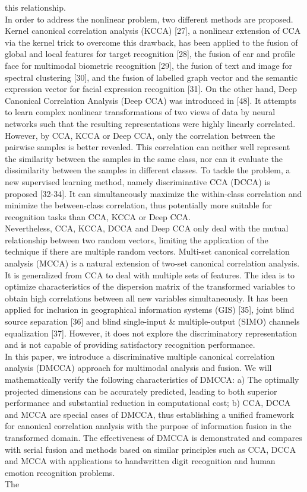\documentclass[journal]{IEEEtran}
\begin{document}
this relationship. \\\indent In order to address the nonlinear problem, two different methods are proposed. Kernel canonical correlation analysis (KCCA) [27], a nonlinear extension of CCA via the kernel trick to overcome this drawback, has been applied to the fusion of global and local features for target recognition [28], the fusion of ear and profile face for multimodal biometric recognition [29], the fusion of text and image for spectral clustering [30], and the fusion of labelled graph vector and the semantic expression vector for facial expression recognition [31]. On the other hand, Deep Canonical Correlation Analysis (Deep CCA) was introduced in [48]. It attempts to learn complex nonlinear transformations of two views of data by neural networks such that the resulting representations were highly linearly correlated. \\\indent However, by CCA, KCCA or Deep CCA, only the correlation between the pairwise samples is better revealed. This correlation can neither well represent the similarity between the samples in the same class, nor can it evaluate the dissimilarity between the samples in different classes. To tackle the problem, a new supervised learning method, namely discriminative CCA (DCCA) is proposed [32-34]. It can simultaneously maximize the within-class correlation and minimize the between-class correlation, thus potentially more suitable for recognition tasks than CCA, KCCA or Deep CCA.  \\\indent Nevertheless, CCA, KCCA, DCCA and Deep CCA only deal with the mutual relationship between two random vectors, limiting the application of the technique if there are multiple random vectors. Multi-set canonical correlation analysis (MCCA) is a natural extension of two-set canonical correlation analysis. It is generalized from CCA to deal with multiple sets of features. The idea is to optimize characteristics of the dispersion matrix of the transformed variables to obtain high correlations between all new variables simultaneously. It has been applied for inclusion in geographical information systems (GIS) [35], joint blind source separation [36] and blind single-input $ \& $ multiple-output (SIMO) channels equalization [37]. However, it does not explore the discriminatory representation and is not capable of providing satisfactory recognition performance.\\\indent In this paper, we introduce a discriminative multiple canonical correlation analysis (DMCCA) approach for multimodal analysis and fusion. We will mathematically verify the following characteristics of DMCCA: a) The optimally projected dimensions can be accurately predicted, leading to both superior performance and substantial reduction in computational cost; b) CCA, DCCA and MCCA are special cases of DMCCA, thus establishing a unified framework for canonical correlation analysis with the purpose of information fusion in the transformed domain. The effectiveness of DMCCA is demonstrated and compares with serial fusion and methods based on similar principles such as CCA, DCCA and MCCA with applications to handwritten digit recognition and human emotion recognition problems.\\\indent The 
\end{document}
